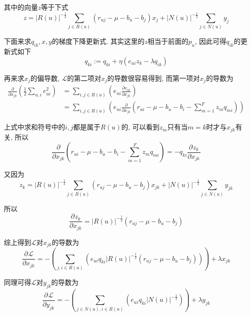 \documentclass[a4paper,UTF8]{ctexart}
\theoremstyle{plain} \newtheorem{theorem}{定理}[section]
\theoremstyle{plain} \newtheorem{definition}{定义}[section]
\theoremstyle{plain} \newtheorem{lemma}{引理}[section]
\theoremstyle{plain} \newtheorem{proposition}{命题}[section]
\theoremstyle{plain} \newtheorem{example}{例}[section]
\theoremstyle{plain} \newtheorem{remark}{注}[section]
\theoremstyle{plain} \newtheorem{corollary}{推论}[section]
\newcommand{\p}[3]{\frac{\partial^{#1}#2}{\partial{#3}^{#1}}}  %
\begin{document}
其中的向量$z$等于下式
\begin{equation*}
z = |R(u)|^{-\frac{1}{2}} \sum_{j \in R(u)} (r_{uj} - \mu - b_{u} - b_{j}) x_{j} + |N(u)|^{-\frac{1}{2}} \sum_{j \in N(u)} y_{j}
\end{equation*}

下面来求$q_{ik},x,y$的梯度下降更新式. 其实这里的$z$相当于前面的$p_{u}$, 因此可得$q_{ik}$的更新式如下
\begin{equation*}
q_{ki} := q_{ki} + \eta (e_{ui} z_{k} - \lambda q_{ik})
\end{equation*}

再来求$x_{j}$的偏导数, $\mathcal{L}$的第二项对$x_j$的导数很容易得到, 而第一项对$x_j$的导数为
\begin{align*}
\frac{\partial}{\partial x_{jk}} \left( \frac{1}{2} \sum_{u,i} e_{ui}^2 \right) & = \sum_{i,j \in R(u)} \left( e_{ui} \p{}{e_{ui}}{x_{jk}} \right) \\ 
& = \sum_{i,j \in R(u)} \left( e_{ui} \frac{\partial}{\partial x_{jk}} \left(r_{ui} - \mu - b_{u} - b_{i} - \sum_{m=1}^{F} z_{m} q_{mi} \right) \right)
\end{align*}

上式中求和符号中的$i,j$都是属于$R(u)$的, 可以看到$z_m$只有当$m=k$时才与$x_{jk}$有关, 所以
\begin{equation*}
\frac{\partial}{\partial x_{jk}} \left(r_{ui} - \mu - b_{u} - b_{i} - \sum_{m=1}^{F} z_{m} q_{mi} \right) = - q_{ki} \p{}{z_k}{x_{jk}}
\end{equation*}

又因为
\begin{equation*}
z_{k} = |R(u)|^{-\frac{1}{2}} \sum_{j \in R(u)} (r_{uj} - \mu - b_{u} - b_{j}) x_{jk} + |N(u)|^{-\frac{1}{2}} \sum_{j \in N(u)} y_{jk}
\end{equation*}

所以
\begin{equation*}
\p{}{z_k}{x_{jk}} = |R(u)|^{-\frac{1}{2}} (r_{uj} - \mu - b_{u} - b_{j})
\end{equation*}

综上得到$\mathcal{L}$对$x_{jk}$的导数为
\begin{equation*}
\p{}{\mathcal{L}}{x_{jk}} = - \left( \sum_{j,i \in R(u)} \left( e_{ui} q_{ki} |R(u)|^{-\frac{1}{2}} (r_{uj} - \mu - b_{u} - b_{j}) \right) \right) + \lambda x_{jk}
\end{equation*}

同理可得$\mathcal{L}$对$y_{jk}$的导数为
\begin{equation*}
\p{}{\mathcal{L}}{y_{jk}} = - \left( \sum_{j \in N(u), i \in R(u)} \left( e_{ui} q_{ki} |N(u)|^{-\frac{1}{2}} \right) \right) + \lambda y_{jk}
\end{equation*}
\end{document}
